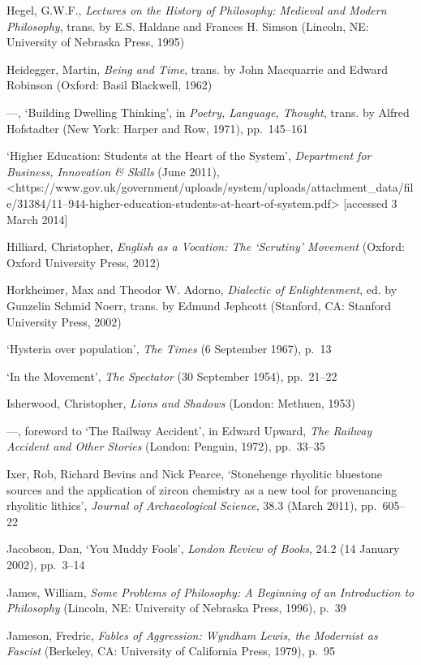 \documentclass[]{article}
\begin{document}
Hegel, G.W.F., \emph{Lectures on the History of Philosophy: Medieval and
Modern Philosophy}, trans. by E.S. Haldane and Frances H. Simson
(Lincoln, NE: University of Nebraska Press, 1995)

Heidegger, Martin, \emph{Being and Time}, trans. by John Macquarrie and
Edward Robinson (Oxford: Basil Blackwell, 1962)

---, `Building Dwelling Thinking', in \emph{Poetry, Language, Thought},
trans. by Alfred Hofstadter (New York: Harper and Row, 1971),
pp.~145--161

`Higher Education: Students at the Heart of the System',
\emph{Department for Business, Innovation \& Skills} (June 2011),\\
\textless{}https://www.gov.uk/government/uploads/system/uploads/attachment\_data/file/31384/11--944-higher-education-students-at-heart-of-system.pdf\textgreater{}
{[}accessed 3 March 2014{]}

Hilliard, Christopher, \emph{English as a Vocation: The `Scrutiny'
Movement} (Oxford: Oxford University Press, 2012)

Horkheimer, Max and Theodor W. Adorno, \emph{Dialectic of
Enlightenment}, ed. by Gunzelin Schmid Noerr, trans. by Edmund Jephcott
(Stanford, CA: Stanford University Press, 2002)

`Hysteria over population', \emph{The Times} (6 September 1967), p.~13

`In the Movement', \emph{The Spectator} (30 September 1954), pp.~21--22

Isherwood, Christopher, \emph{Lions and Shadows} (London: Methuen, 1953)

---, foreword to `The Railway Accident', in Edward Upward, \emph{The
Railway Accident and Other Stories} (London: Penguin, 1972), pp.~33--35

Ixer, Rob, Richard Bevins and Nick Pearce, `Stonehenge rhyolitic
bluestone sources and the application of zircon chemistry as a new tool
for provenancing rhyolitic lithics', \emph{Journal of Archaeological
Science}, 38.3 (March 2011), pp.~605--22

Jacobson, Dan, `You Muddy Fools', \emph{London Review of Books}, 24.2
(14 January 2002), pp.~3--14

James, William, \emph{Some Problems of Philosophy: A Beginning of an
Introduction to Philosophy} (Lincoln, NE: University of Nebraska Press,
1996), p.~39

Jameson, Fredric, \emph{Fables of Aggression: Wyndham Lewis, the
Modernist as Fascist} (Berkeley, CA: University of California Press,
1979), p.~95
\end{document}
